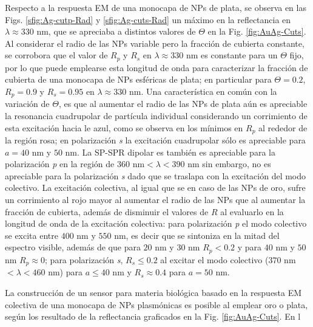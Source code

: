 Respecto a la respuesta EM de una monocapa de NPs de plata, se observa en las Figs. \ref{sfig:Ag-cutp-Rad} y \ref{sfig:Ag-cuts-Rad} un máximo en la reflectancia en $\lambda \approx 330$ nm, que se apreciaba a distintos valores de $\Theta$ en la Fig. \ref{fig:AuAg-Cuts}. Al considerar el radio de las NPs variable pero la fracción de cubierta constante, se corrobora que el valor de $R_p$ y $R_s$ en $\lambda\approx 330$ nm es constante para un $\Theta$ fijo, por lo que puede emplearse esta longitud de onda para caracterizar la fracción de cubierta de una monocapa de NPs esféricas de plata; en particular para $\Theta=0.2$, $R_p = 0.9$ y $R_s = 0.95$ en $\lambda \approx 330$ nm. Una característica en común con la variación de $\Theta$, es que al aumentar el radio de las NPs de plata aún es apreciable la resonancia cuadrupolar de partícula individual considerando un corrimiento de esta excitación hacia le azul, como se observa en los mínimos en $R_p$ al rededor de la región rosa; en polarización \emph{s} la excitación cuadrupolar sólo es apreciable para $a=40$ nm y $50$ nm. La SP-SPR dipolar es también es apreciable para la polarización \emph{p} en la región de $360$ nm$<\lambda<390$ nm sin embargo, no es apreciable para la polarización \emph{s} dado que se traslapa con la excitación del modo colectivo. La excitación colectiva, al igual que se en caso de las NPs de oro, sufre un corrimiento al rojo mayor al aumentar el radio de las NPs que al aumentar la fracción de cubierta, además de disminuir el valores de $R$ al evaluarlo en la longitud de onda de la excitación colectiva: para polarización \emph{p} el modo colectivo se excita entre $400$ nm y $550$ nm, es decir que se sintoniza en la mitad del espectro visible, además de que para $20$ nm y $30$ nm $R_p<0.2$ y para $40$ nm y $50$ nm $R_p \approx 0$; para polarización \emph{s}, $R_s\leq 0.2$ al excitar el modo colectivo ($370$ nm$<\lambda<460$ nm) para $a\leq 40$ nm y $R_s\approx 0.4$ para $a=50$ nm.



La construcción de un sensor para materia biológica basado en la respuesta EM colectiva de una monocapa de NPs plasmónicas es posible al emplear oro o plata, según los resultado de la reflectancia graficados en la Fig. \ref{fig:AuAg-Cuts}.  En l




